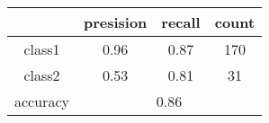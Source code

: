 \begin{tabular}{ | c | c | c | c | }
	\hline
	& presision & recall & count \\ \hline
	class1 & 0.96 & 0.87 & 170 \\ \hline
	class2 & 0.53 & 0.81 & 31  \\ \hline
	\hline
	accuracy & \multicolumn{3}{c|}{0.86} \\
	\hline
\end{tabular}